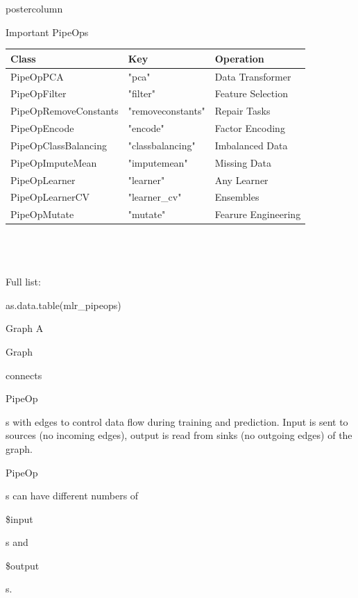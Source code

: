\documentclass{beamer}
\newcommand{\codeinline}[1]{\begin{codeboxinline}#1\end{codeboxinline}}
\begin{document}
\begin{frame}[fragile]{}
\begin{columns}
\begin{column}{.245\textwidth}
\begin{beamercolorbox}[center]{postercolumn}
\begin{minipage}{.98\textwidth}
{            \begin{myblock}{Important PipeOps}
              \vspace{-0.5em}
              \begin{footnotesize}
                \begin{centering}
                  \begin{tabular}{l l l}
                    \textbf{Class} & \textbf{Key} & \textbf{Operation} \\ \hline
                    PipeOpPCA & "pca" & Data Transformer\\
                    PipeOpFilter & "filter" & Feature Selection\\
                    PipeOpRemoveConstants & "removeconstants" & Repair Tasks\\
                    PipeOpEncode & "encode" & Factor Encoding\\
                    PipeOpClassBalancing & "classbalancing" & Imbalanced Data\\
                    PipeOpImputeMean & "imputemean" & Missing Data\\
                    PipeOpLearner & "learner" & Any Learner\\
                    PipeOpLearnerCV & "learner\_cv" & Ensembles\\
                    PipeOpMutate & "mutate" & Fearure Engineering\\ \hline
                  \end{tabular}
                \end{centering}
              \end{footnotesize}
              \ \\
              \ \\
              \ \\
              Full list: \codeinline{as.data.table(mlr\_pipeops)}
						\end{myblock}
            \vspace{-0.5em}
						\begin{myblock}{Graph}
              \vspace{-0.5em}
              A \codeinline{Graph} connects \codeinline{PipeOp}s with edges to control data flow during training and prediction. Input is sent to sources (no incoming edges), output is read from sinks (no outgoing edges) of the graph. \codeinline{PipeOp}s can have different numbers of \codeinline{\$input}s and  \codeinline{\$output}s.\\
              \ \\

\end{myblock}}
\end{minipage}
\end{beamercolorbox}
\end{column}
\end{columns}
\end{frame}
\end{document}

